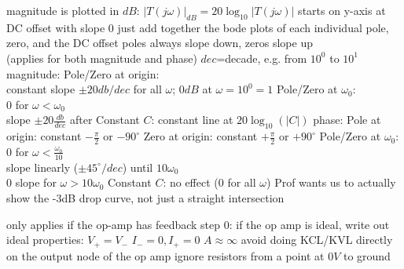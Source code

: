 \documentclass[12pt]{article}
\begin{document}
\begin{spacing}{0.8}
\begin{multicols*}{2}
\begin{flushleft}
\begin{outline}[longenum]
  \1 magnitude is plotted in $dB$: $|T(j\omega)|_{dB}=20\log_{10}|T(j\omega)|$
  \1 starts on y-axis at DC offset with slope 0
  \1 just add together the bode plots of each individual pole, zero, and the DC offset
  \1 poles always slope down, zeros slope up
    \\ (applies for both magnitude and phase)
  \1 $dec$=decade, e.g. from $10^0$ to $10^1$
  \1 magnitude:
    \2 Pole/Zero at origin:
      \\ constant slope $\pm20db/dec$ for all $\omega$; $0dB$ at $\omega=10^0=1$
    \2 Pole/Zero at $\omega_0$:
      \\ 0 for $\omega<\omega_0$
      \\ slope $\pm20\frac{db}{dec}$ after
    \2 Constant $C$: constant line at $20\log_{10}(|C|)$
  \1 phase:
    \2 Pole at origin: constant $-\frac{\pi}{2}$ or $-90^\circ$
    \2 Zero at origin: constant $+\frac{\pi}{2}$ or $+90^\circ$
    \2 Pole/Zero at $\omega_0$:
      \\ $0$ for $\omega<\frac{\omega_0}{10}$
      \\ slope linearly ($\pm45^\circ/dec$) until $10\omega_0$
      \\ $0$ slope for $\omega>10\omega_0$
    \2 Constant $C$: no effect ($0$ for all $\omega$)
  \1 Prof wants us to actually show the -3dB drop curve, not just a straight intersection

  \1 only applies if the op-amp has feedback
  \1 step 0: if the op amp is ideal, write out ideal properties:
    \2 $V_+=V_-$
    \2 $I_-=0,I_+=0$
  \2 $A \approx \infty$
  \1 avoid doing KCL/KVL directly on the output node of the op amp
  \1 ignore resistors from a point at $0V$ to ground





\end{outline}
\end{flushleft}
\end{multicols*}
\end{spacing}
\end{document}
